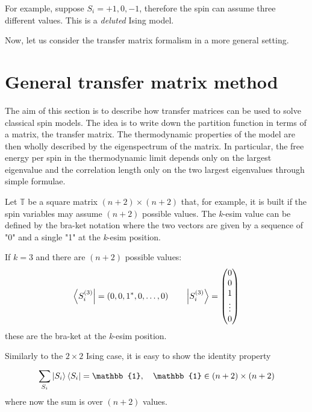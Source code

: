 \documentclass[../main/main.tex]{subfiles}
\begin{document}
\begin{example}{}{}
  For example, suppose \( S_i = +1,0,-1 \), therefore the spin can assume three different values.   This is a \emph{deluted} Ising model.
\end{example}
Now, let us consider the transfer matrix formalism in a more general setting.

\section{General transfer matrix method}
The aim of this section is to describe how transfer matrices can be used to solve classical spin models. The idea is to write down the partition function in terms of a matrix, the transfer matrix. The thermodynamic properties of the model are then wholly described by the eigenspectrum of the matrix. In particular, the free energy per spin in the thermodynamic limit depends only on the largest eigenvalue and the correlation length only on the two largest eigenvalues through simple formulae.

Let \( \mathbb{T} \) be a square matrix \( (n+2) \times (n+2) \) that, for example, it is built if the spin variables may assume \( (n+2) \) possible values. The \emph{k}-esim value can be defined by the bra-ket notation where the two vectors are given by a sequence of "0" and a single "1" at the \emph{k}-esim  position.
\begin{example}{}{}
If \( k=3 \) and there are \( (n+2) \)  possible values:
  \begin{equation*}
    \bra{S_i^{(3)}} = (0,0,1^*,0,\dots,0) \qquad   \ket{S_i^{(3)}} = \begin{pmatrix}
      0 \\
      0 \\
      1 \\
      \vdots \\
      0
      \end{pmatrix}
  \end{equation*}
these are the bra-ket at the \emph{k}-esim position.
\end{example}
Similarly to the \( 2 \times 2 \) Ising case, it is easy to show the identity property
\begin{equation}
  \sum_{S_i}^{} \ket{S_i} \bra{S_i} = \mathbb{1}, \quad \mathbb{1} \in (n+2)\times(n+2)
\end{equation}
where now the sum is over \( (n+2) \) values.
\end{document}
